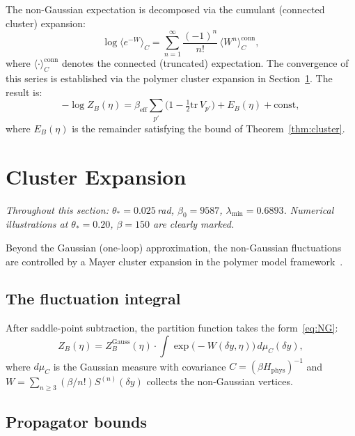 \documentclass[11pt]{article}
\theoremstyle{definition}
\newcommand{\tr}{\mathrm{tr}}
\begin{document}
The non-Gaussian expectation is decomposed via the cumulant (connected
cluster) expansion:
\begin{equation}\label{eq:cumulant}
\log\bigl\langle e^{-W}\bigr\rangle_C
=\sum_{n=1}^\infty\frac{(-1)^n}{n!}\,\langle W^n\rangle_C^{\mathrm{conn}},
\end{equation}
where $\langle\cdot\rangle_C^{\mathrm{conn}}$ denotes the connected
(truncated) expectation.  The convergence of this series is established
via the polymer cluster expansion in Section~\ref{sec:cluster}.  The
result is:
\begin{equation}
-\log Z_B(\eta)=\beta_{\mathrm{eff}}\sum_{p'}
\bigl(1-\tfrac{1}{2}\tr\,V_{p'}\bigr)
+E_B(\eta)+\text{const},
\end{equation}
where $E_B(\eta)$ is the remainder satisfying the bound of
Theorem~\ref{thm:cluster}.

\section{Cluster Expansion}\label{sec:cluster}

\noindent\emph{Throughout this section:
$\theta_*=0.025$\,rad, $\beta_0=9587$,
$\lambda_{\min}=0.6893$.  Numerical illustrations
at $\theta_*=0.20$, $\beta=150$ are clearly marked.}

\medskip
Beyond the Gaussian (one-loop) approximation, the non-Gaussian
fluctuations are controlled by a Mayer cluster expansion in the
polymer model framework~\cite{Brydges86,KP}.

\subsection{The fluctuation integral}

After saddle-point subtraction, the partition function takes the
form~\eqref{eq:NG}:
\begin{equation}
Z_B(\eta)=Z_B^{\mathrm{Gauss}}(\eta)\cdot
\int\exp\bigl(-W(\delta y,\eta)\bigr)\,d\mu_C(\delta y),
\end{equation}
where $d\mu_C$ is the Gaussian measure with covariance
$C=(\beta H_{\mathrm{phys}})^{-1}$ and $W=\sum_{n\ge 3}
(\beta/n!)S^{(n)}(\delta y)$ collects the non-Gaussian vertices.

\subsection{Propagator bounds}
\end{document}
